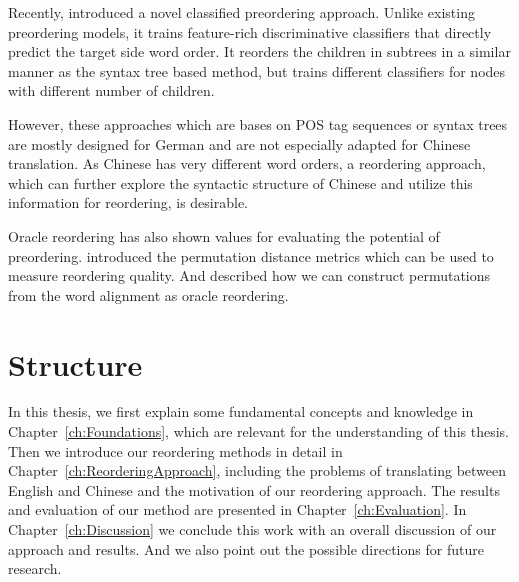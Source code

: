 Recently, \cite{google} introduced a novel classified preordering approach. Unlike existing preordering models, it trains feature-rich discriminative classifiers that directly predict the target side word order. It reorders the children in subtrees in a similar manner as the syntax tree based method, but trains different classifiers for nodes with different number of children.

However, these approaches which are bases on POS tag sequences or syntax trees are mostly designed for German and are not especially adapted for Chinese translation. As Chinese has very different word orders, a reordering approach, which can further explore the syntactic structure of Chinese and utilize this information for reordering, is desirable.

Oracle reordering has also shown values for evaluating the potential of preordering. \cite{metrics} introduced the permutation distance metrics which can be used to measure reordering quality. And \cite{birch2} described how we can construct permutations from the word alignment as oracle reordering.

\section{Structure}
\label{ch:Introduction:sec:Structure}

In this thesis, we first explain some fundamental concepts and knowledge in Chapter~\ref{ch:Foundations}, which are relevant for the understanding of this thesis. Then we introduce our reordering methods in detail in Chapter~\ref{ch:ReorderingApproach}, including the problems of translating between English and Chinese and the motivation of our reordering approach. The results and evaluation of our method are presented in Chapter~\ref{ch:Evaluation}. In Chapter~\ref{ch:Discussion} we conclude this work with an overall discussion of our approach and results. And we also point out the possible directions for future research.